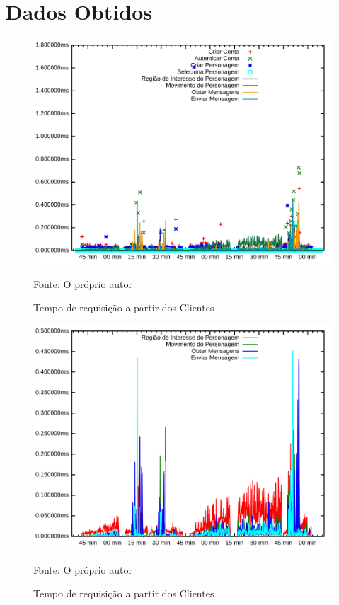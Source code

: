  
\chapter{Dados Obtidos}
\label{cap6}

\begin{figure}[htb!]
    \caption{Tempo de requisição a partir dos Clientes}
    \includegraphics[width=\textwidth]{metricas_rudy_t3/rudyc.png}
    \centering
    
    Fonte: O próprio autor
\end{figure}

\begin{figure}[htb!]
    \caption{Tempo de requisição a partir dos Clientes}
    \includegraphics[width=\textwidth]{metricas_rudy_t3/rudyc_rpc.png}
    \centering
    
    Fonte: O próprio autor
\end{figure}


